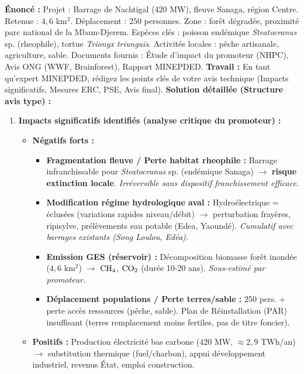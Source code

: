 \documentclass[11pt]{article}
\begin{document}
\begin{exoresolu}
    \textbf{Énoncé :} Projet : Barrage de Nachtigal (420 MW), fleuve Sanaga, région Centre. Retenue : $4,6$ km$^2$. Déplacement : $250$ personnes. Zone : forêt dégradée, proximité parc national de la Mbam-Djerem. Espèces clés : poisson endémique \emph{Steatocranus} sp. (rheophile), tortue \emph{Trionyx triunguis}. Activités locales : pêche artisanale, agriculture, sable. Documents fournis : Étude d'impact du promoteur (NHPC), Avis ONG (WWF, Brainforest), Rapport MINEPDED.
    \textbf{Travail :} En tant qu'expert MINEPDED, rédigez les points clés de votre avis technique (Impacts significatifs, Mesures ERC, PSE, Avis final).
    \tcblower
    \textbf{Solution détaillée (Structure avis type) :}
    \begin{enumerate}
        \item \textbf{Impacts significatifs identifiés (analyse critique du promoteur) :}
        \begin{itemize}
            \item \textbf{Négatifs forts :}
            \begin{itemize}
                \item \textbf{Fragmentation fleuve / Perte habitat rheophile :} Barrage infranchissable pour \emph{Steatocranus} sp. (endémique Sanaga) $\rightarrow$ \textbf{risque extinction locale}. \textit{Irréversible sans dispositif franchissement efficace.}
                \item \textbf{Modification régime hydrologique aval :} Hydroélectrique = éclusées (variations rapides niveau/débit) $\rightarrow$ perturbation frayères, ripisylve, prélèvements eau potable (Edea, Yaoundé). \textit{Cumulatif avec barrages existants (Song Loulou, Edéa).}
                \item \textbf{Emission GES (réservoir) :} Décomposition biomasse forêt inondée ($4,6$ km$^2$) $\rightarrow$ $\ce{CH4}$, $\ce{CO2}$ (durée 10-20 ans). \textit{Sous-estimé par promoteur.}
                \item \textbf{Déplacement populations / Perte terres/sable :} 250 pers. + perte accès ressources (pêche, sable). Plan de Réinstallation (PAR) insuffisant (terres remplacement moins fertiles, pas de titre foncier).
            \end{itemize}
            \item \textbf{Positifs :} Production électricité bas carbone ($420$ MW, $\approx 2,9$ TWh/an) $\rightarrow$ substitution thermique (fuel/charbon), appui développement industriel, revenus État, emploi construction.

\end{itemize}
\end{enumerate}
\end{exoresolu}
\end{document}

